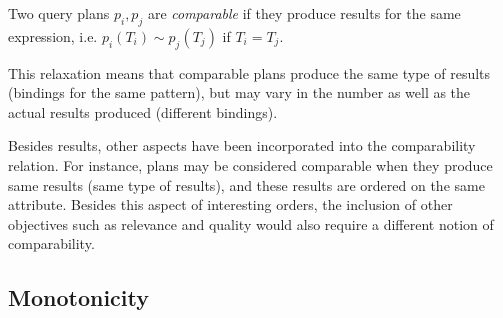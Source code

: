 \begin{definition}
  \label{def:comparability}
  Two query plans $p_i, p_j$ are \emph{comparable} if they produce results for the same expression, i.e. $p_i(T_i) \sim  p_j(T_j)$ if $T_i = T_j$. 
\end{definition}

This relaxation means that comparable plans produce the same type of results (bindings for the same pattern), but may vary in the number as well as the actual results produced (different bindings). 

Besides results, other aspects have been incorporated into the
comparability relation. For instance, plans may be considered
comparable when they produce same results (same type of results), and
these results are ordered on the same attribute.
Besides this aspect of interesting orders, the inclusion of other objectives such as relevance and quality would also require a different notion of comparability.  

\subsection{Monotonicity}
\label{sec:sharing}


